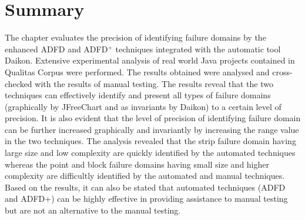 \section{Summary} \label{sec:conclusion}

The chapter evaluates the precision of identifying failure domains by the enhanced ADFD and ADFD$^+$ techniques integrated with the automatic tool Daikon. Extensive experimental analysis of real world Java projects contained in Qualitas Corpus were performed. The results obtained were analysed and cross-checked with the results of manual testing. The results reveal that the two techniques can effectively identify and present all types of failure domains (graphically by JFreeChart and as invariants by Daikon) to a certain level of precision. It is also evident that the level of precision of identifying failure domain can be further increased graphically and invariantly by increasing the range value in the two techniques. 
The analysis revealed that the strip failure domain having large size and low complexity are quickly identified by the automated techniques whereas the point and block failure domains having small size and higher complexity are difficultly identified by the automated and manual techniques. Based on the results, it can also be stated that automated techniques (ADFD and ADFD+) can be highly effective in providing assistance to manual testing but are not an alternative to the manual testing.  

















